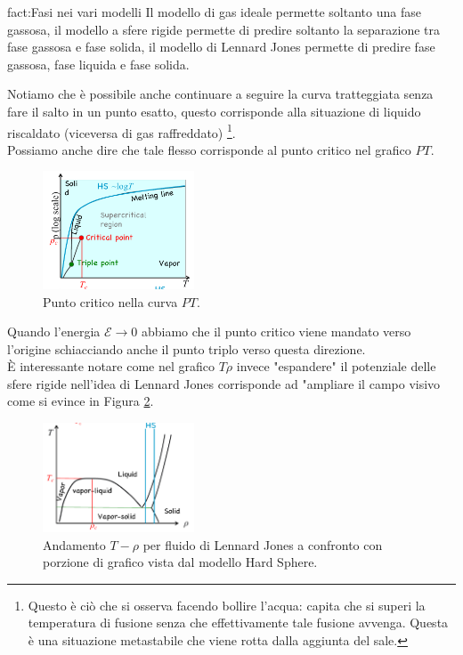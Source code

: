 \newpage
\begin{fact}{fact:Fasi nei vari modelli}
	Il modello di gas ideale permette soltanto una fase gassosa, il modello a sfere
	rigide permette di predire soltanto la separazione tra fase gassosa e fase solida,
	il modello di Lennard Jones permette di predire fase gassosa, fase liquida 
	e fase solida.
\end{fact}
Notiamo che è possibile anche continuare a seguire la curva tratteggiata senza fare il salto in un punto esatto, questo corrisponde alla situazione di liquido riscaldato (viceversa di gas raffreddato)
\footnote{Questo è ciò che si osserva facendo bollire l'acqua: capita che si superi la temperatura di fusione senza che effettivamente tale fusione avvenga. Questa è una situazione metastabile che viene rotta dalla aggiunta del sale.}.\\
Possiamo anche dire che tale flesso corrisponde al punto critico nel grafico $PT$.
\begin{figure}[H]
	\centering
	\includegraphics[width=0.4\textwidth]{figures/Punto-triplo.png}
	\caption{Punto critico nella curva $PT$.}
	\label{fig:figures-Punto-triplo-png}
\end{figure}
Quando l'energia $\mathcal{E}\to 0$ abbiamo che il punto critico viene mandato verso l'origine schiacciando anche il punto triplo verso questa direzione.\\
È interessante notare come nel grafico $T\rho $ invece "espandere" il potenziale delle sfere rigide nell'idea di Lennard Jones corrisponde ad "ampliare il campo visivo come si evince in Figura \ref{fig:figures-grafico-T-rho-png}.
\begin{figure}[H]
	\centering
	\includegraphics[width=0.4\textwidth]{figures/grafico-T-rho.png}
	\caption{\scriptsize Andamento $T-\rho $ per fluido di Lennard Jones a confronto con porzione di grafico vista dal modello Hard Sphere.}
	\label{fig:figures-grafico-T-rho-png}
\end{figure}
